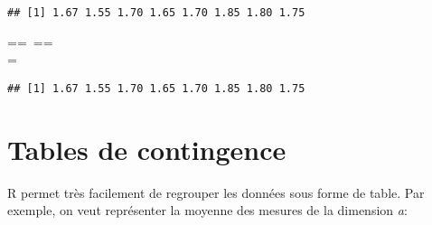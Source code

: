 \begin{knitrout}
\color{fgcolor}\begin{kframe}
\begin{flushleft}
\ttfamily\noindent
{}\hlkeyword{\usebox{\hlnormalsizeboxdollar}}\mbox{}
\normalfont
\end{flushleft}
\begin{verbatim}
## [1] 1.67 1.55 1.70 1.65 1.70 1.85 1.80 1.75
\end{verbatim}
\begin{flushleft}
\ttfamily\noindent
{}\hlkeyword{(}\hlkeyword{\usebox{\hlnormalsizeboxdollar}}\hlkeyword{,}{\ }\hlkeyword{(}\hlkeyword{\usebox{\hlnormalsizeboxdollar}}=={\ }\hlkeyword{)}{\ }\hlkeyword{\usebox{\hlnormalsizeboxand}}{\ }\hlkeyword{(}\hlkeyword{\usebox{\hlnormalsizeboxdollar}}=={\ }\hlkeyword{)}{\ }\hlkeyword{\usebox{\hlnormalsizeboxand}}\hspace*{\fill}\\
\hlstd{}{\ }{\ }{\ }{\ }\hlkeyword{(}\hlkeyword{\usebox{\hlnormalsizeboxdollar}}\usebox{\hlnormalsizeboxlessthan}={\ }\hlkeyword{)}\hlkeyword{)}\mbox{}
\normalfont
\end{flushleft}
\begin{verbatim}
## [1] 1.67 1.55 1.70 1.65 1.70 1.85 1.80 1.75
\end{verbatim}
\end{kframe}
\end{knitrout}


\section{Tables de contingence}

R permet très facilement de regrouper les données sous forme de table. Par exemple, on veut représenter la moyenne des mesures de la dimension \emph{a}:

